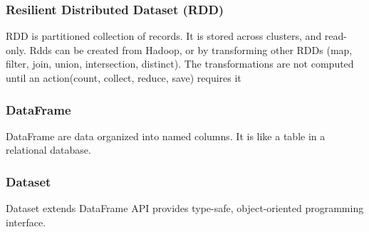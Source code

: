 \subsubsection{Resilient Distributed Dataset (RDD)}
RDD is partitioned collection of records. It is stored across clusters, and read-only. Rdds can be created from Hadoop, or by transforming other RDDs (map, filter, join, union, intersection, distinct). The transformations are not computed until an action(count, collect, reduce, save) requires it

\subsubsection{DataFrame}
DataFrame are data organized into named columns. It is like a table in a relational database. 

\subsubsection{Dataset}
Dataset extends DataFrame API provides type-safe, object-oriented programming interface. 